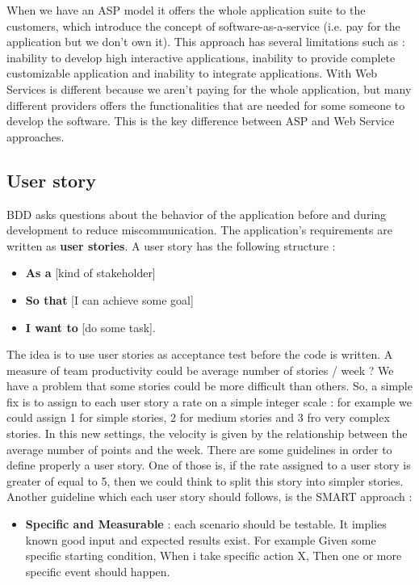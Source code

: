 \documentclass[11pt]{article}
\begin{document}
When we have an ASP model it offers the whole application suite to the customers, which introduce the concept of software-as-a-service (i.e. pay for the application but we don't own it). This approach has several limitations such as : inability to develop high interactive applications, inability to provide complete customizable application and inability to integrate applications. With Web Services is different because we aren't paying for the whole application, but many different providers offers the functionalities that are needed for some someone to develop the software. This is the key difference between ASP and Web Service approaches.
\begin{appendix}
\section{User story}
BDD asks questions about the behavior of the application before and during development to reduce miscommunication. The application's requirements are written as \textbf{user stories}. A user story has the following structure :
\begin{itemize}
\item \textbf{As a} [kind of stakeholder]
\item \textbf{So that} [I can achieve some goal]
\item \textbf{I want to} [do some task].
\end{itemize}
The idea is to use user stories as acceptance test before the code is written. A measure of team productivity could be average number of stories / week ? We have a problem that some stories could be more difficult than others. So, a simple fix is to assign to each user story a rate on a simple integer scale : for example we could assign 1 for simple stories, 2 for medium stories and 3  fro very complex stories. In this new settings, the velocity is given by the relationship between the average number of points and the week. There are some guidelines in order to define properly a user story. One of those is, if the rate assigned to a user story is greater of equal to 5, then we could think to split this story into simpler stories. Another guideline which each user story should follows, is the SMART approach :
\begin{itemize}
\item \textbf{Specific and Measurable} : each scenario should be testable. It implies known good input and expected results exist. For example Given some specific starting condition, When i take specific action X, Then one or more specific event should happen.

\end{itemize}
\end{appendix}
\end{document}
